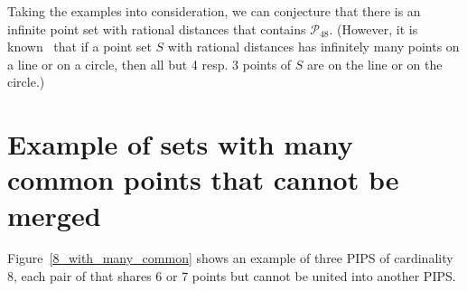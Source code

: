 \documentclass[12pt]{article}
\theoremstyle{theorem}
\theoremstyle{dfn}
\theoremstyle{remark}
\begin{document}
Taking the examples into consideration,
we can conjecture that there is an infinite point set with rational distances
that contains $\mathcal{P}_{48}$.
(However, it is known~\cite{solymosi2010question} that
if a point set $S$ with rational distances has infinitely many points on a line or on a circle,
then all but 4 resp. 3 points of $S$ are on the line or on the circle.)


\section{Example of sets with many common points that cannot be merged}

Figure~\ref{8_with_many_common} shows an example of three PIPS of cardinality 8,
each pair of that shares 6 or 7 points but cannot be united into another PIPS.
\end{document}
